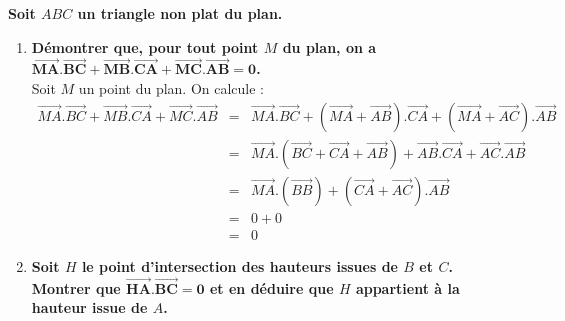 \documentclass[a4paper, 11pt]{article}
\begin{document}
\begin{correction}  \;
	\textbf{Soit $ABC$ un triangle non plat du plan.}
	\begin{enumerate}
		\item \textbf{D\'emontrer que, pour tout point $M$ du plan, on a $\mathbf{\overrightarrow{MA}.\overrightarrow{BC} + \overrightarrow{MB}.\overrightarrow{CA} + \overrightarrow{MC}.\overrightarrow{AB} = 0}$.}\\
		      Soit $M$ un point du plan. On calcule :\\
		      $$\begin{array}{lcl}\overrightarrow{MA}.\overrightarrow{BC} + \overrightarrow{MB}.\overrightarrow{CA} + \overrightarrow{MC}.\overrightarrow{AB} & = & \overrightarrow{MA}.\overrightarrow{BC} + \left(\overrightarrow{MA}+\overrightarrow{AB}\right).\overrightarrow{CA} + \left(\overrightarrow{MA}+\overrightarrow{AC}\right).\overrightarrow{AB} \\
                                                                                                                                              & = & \overrightarrow{MA}.\left(\overrightarrow{BC} + \overrightarrow{CA} +\overrightarrow{AB}\right) + \overrightarrow{AB}.\overrightarrow{CA} +\overrightarrow{AC}.\overrightarrow{AB}            \\
                                                                                                                                              & = & \overrightarrow{MA}.\left(\overrightarrow{BB}\right) + \left(\overrightarrow{CA} +\overrightarrow{AC}\right).\overrightarrow{AB}                                                              \\
                                                                                                                                              & = & 0+0                                                                                                                                                                                           \\
                                                                                                                                              & = & 0\end{array}$$
		\item \textbf{Soit $H$ le point d'intersection des hauteurs issues de $B$ et $C$. \\
			      Montrer que $\mathbf{\overrightarrow{HA}.\overrightarrow{BC} = 0}$ et en d\'eduire que $H$ appartient \`a la hauteur issue de $A$.}\\

\end{enumerate}
\end{correction}
\end{document}
